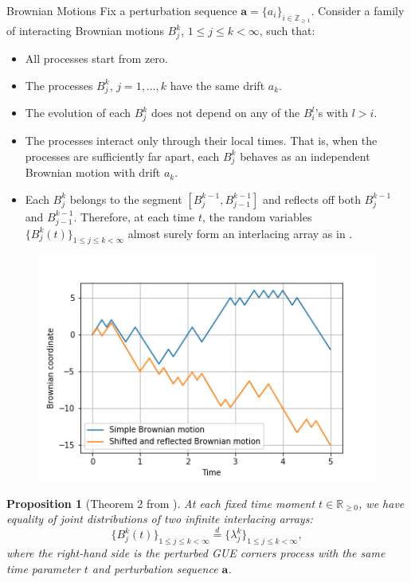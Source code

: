 \documentclass[english,final,t]{beamer}
\newtheorem{proposition}{Proposition}[section]
\begin{document}
\begin{frame}{}
\begin{columns}[t]
\begin{column}{.26\linewidth}
\begin{block}{Brownian Motions}
Fix a perturbation sequence $\mathbf{a}=\{a_i \}_{i\in \mathbb{Z}_{\ge1}}$.
Consider a family of interacting Brownian motions 
$B^k_j$, $1\le j\le k<\infty$, such that:
\begin{itemize}
	\item All processes start from zero.
	\item The processes $B^k_j$, $j=1,\ldots,k $
		have the same drift $a_k$.
	\item The evolution of each $B^k_j$
		does not depend on any of the $B^l_i$'s with $l>i$.
	\item The processes interact only through their local times.
		That is, when the processes are sufficiently far apart,
		each $B^k_j$ behaves as an independent Brownian motion 
		with drift $a_k$.
	\item Each $B^k_j$ belongs to the segment
		$[B^{k-1}_j,B^{k-1}_{j-1}]$
		and reflects off 
		both 
		$B^{k-1}_j$ and $B^{k-1}_{j-1}$.
		Therefore, at each time $t$, the 
		random variables
		$\{B^k_j(t)\}_{1\le j\le k<\infty}$ almost surely form
		an interlacing array as in .
\end{itemize}
\end{block}
\begin{figure}[bm]
	\centering
	\includegraphics[width=.9\textwidth]{reflected_bm.png}
	\label{fig:bm}
\end{figure}
\begin{proposition}[Theorem 2 from \cite{ferrari2014perturbedGUE}]
	\label{prop:connection_to_reflected_BM}
	At each fixed time moment $t\in \mathbb{R}_{\ge0}$, we have equality
	of joint distributions of two infinite interlacing arrays:
	\begin{equation*}
		\{B^k_j(t)\}_{1\le j\le k<\infty}
		\stackrel{d}{=}
		\{\lambda^k_j\}_{1\le j\le k<\infty},
	\end{equation*}
	where the right-hand side is the perturbed GUE
	corners process with the same time parameter $t$
	and perturbation sequence $\mathbf{a}$.
\end{proposition}


\end{column}
\end{columns}
\end{frame}
\end{document}

